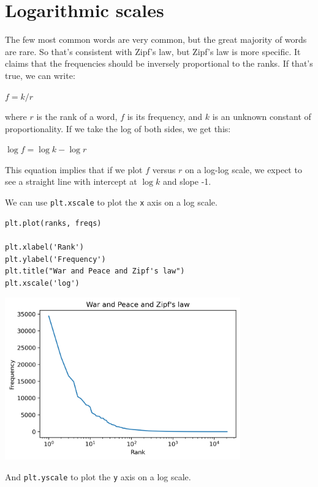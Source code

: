 \hypertarget{logarithmic-scales}{%
\section{Logarithmic scales}\label{logarithmic-scales}}

The few most common words are very common, but the great majority of
words are rare. So that's consistent with Zipf's law, but Zipf's law is
more specific. It claims that the frequencies should be inversely
proportional to the ranks. If that's true, we can write:

\(f = k / r\)

where \(r\) is the rank of a word, \(f\) is its frequency, and \(k\) is
an unknown constant of proportionality. If we take the log of both
sides, we get this:

\(\log f = \log k - \log r\)

This equation implies that if we plot \(f\) versus \(r\) on a log-log
scale, we expect to see a straight line with intercept at \(\log k\) and
slope -1.

We can use \passthrough{\lstinline!plt.xscale!} to plot the
\passthrough{\lstinline!x!} axis on a log scale.

\begin{lstlisting}[]
plt.plot(ranks, freqs)

plt.xlabel('Rank')
plt.ylabel('Frequency')
plt.title("War and Peace and Zipf's law")
plt.xscale('log')
\end{lstlisting}

\begin{center}
\includegraphics[width=4in]{06_plotting_files/06_plotting_76_0.png}
\end{center}

And \passthrough{\lstinline!plt.yscale!} to plot the
\passthrough{\lstinline!y!} axis on a log scale.

